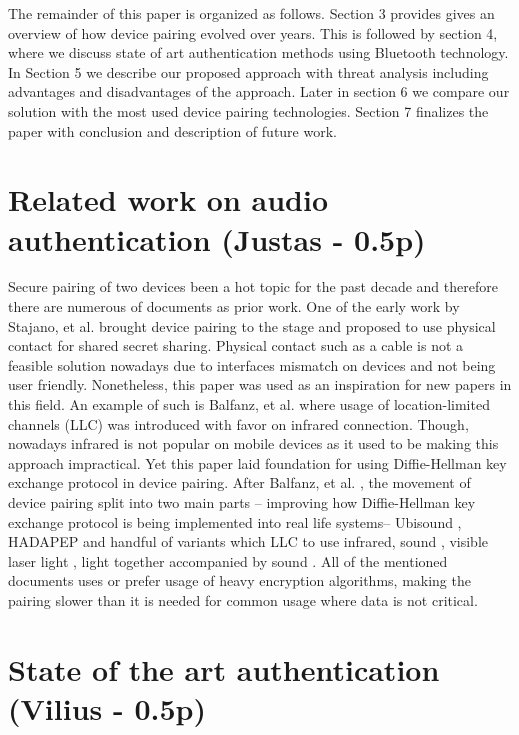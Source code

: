 \documentclass[12pt]{article}
\begin{document}
\newline
The remainder of this paper is organized as follows.
Section 3 provides gives an overview of how device pairing evolved over years. This is followed by section 4, where we discuss state of art authentication methods using Bluetooth technology. In Section 5 we describe our proposed approach with threat analysis including advantages and disadvantages of the approach. Later in section 6 we compare our solution with the most used device pairing technologies. Section 7 finalizes the paper with conclusion and description of future work.

\newpage

\section{Related work on audio authentication (Justas - 0.5p)}
\label{sec:Related work on audio authentication}
Secure pairing of two devices been a hot topic for the past decade and therefore there are numerous of documents as prior work. One of the early work by  Stajano, et al. \cite {pairingintro} brought device pairing to the stage and proposed to use physical contact for shared secret sharing. Physical contact such as a cable is not a feasible solution nowadays due to interfaces mismatch on devices and not being user friendly. Nonetheless, this paper was used as an inspiration for new papers in this field. An example of such is Balfanz, et al. \cite {talkingto} where usage of location-limited channels (LLC) was introduced with favor on infrared connection. Though, nowadays infrared is not popular on mobile devices as it used to be making this approach impractical. Yet this paper laid foundation for using Diffie-Hellman key exchange protocol in device pairing. After Balfanz, et al. \cite {talkingto} , the movement of device pairing split into two main parts – improving how Diffie-Hellman key exchange protocol is being implemented into real life systems– Ubisound \cite {ubisound}, HADAPEP \cite {hadapep} and handful of variants which LLC to use infrared, sound \cite {talkingto}, visible laser light \cite {laserlight}, light together accompanied by sound \cite {beeplight}.
\newline
All of the mentioned documents uses or prefer usage of heavy encryption algorithms, making the pairing slower than it is needed for common usage where data is not critical.

\section{State of the art authentication (Vilius - 0.5p)}
\label{sec:State of the art authentication}
\end{document}
